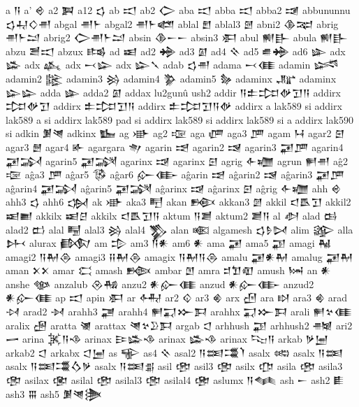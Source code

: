  a  𒀀   
 a'  𒄴   
 a2  𒀉   
 a12  𒌓   
 ab  𒀊   
 ab2  𒀖   
 aba  𒀊   
 abba  𒀊   
 abba2  𒀋   
 abbununnu  𒌓𒄷𒄭𒉣    
 abgal  𒉣𒈨    
 abgal2  𒉣𒈨𒅤    
 ablal  𒆼   
 ablal3  𒇦   
 abni2  𒆠𒉈    
 abrig  𒉣𒈨𒁺    
 abrig2  𒀖𒉣𒈨𒁺    
 absin  𒆠𒀸𒀸    
 absin3  𒀳   
 abul  𒆍𒃲    
 abula  𒆍𒃲    
 abzu  𒍪𒀊    
 abzux  𒌤   
 ad  𒀜   
 ad2  𒄉   
 ad3  𒇼   
 ad4  𒍞   
 ad5  𒌑𒄉    
 ad6  𒇿   
 adx  𒈕   
 adx  𒎉   
 adx  𒁁𒇽    
 adx  𒇽𒃵      
 adab  𒌓𒉣    
 adama  𒁁𒈪    
 adamin  𒈓   
 adamin2  𒈘   
 adamin3  𒄒   
 adamin4  𒉫   
 adamin5  𒂛   
 adaminx  𒂜   
 adaminx  𒇽𒇽    
 adda  𒇿   
 adda2  𒇼   
 addax  lu2gunû ush2  
 addir  𒀀𒉺𒄐𒉻𒋛𒀀    
 addirx  𒄐𒉻𒋛    
 addirx  𒉺𒄐𒋛𒀀    
 addirx  𒉺𒄐𒋛𒀀𒉻    
 addirx  a lak589 si   
 addirx  lak589 a si   
 addirx  lak589 pad si   
 addirx  lak589 si   
 addirx  lak589 si a   
 addirx  lak590 si   
 adkin  𒋠𒇴    
 adkinx  𒋁   
 ag  𒀝   
 ag2  𒉘   
 aga  𒂇   
 aga3  𒂆   
 agam  𒀂   
 agar2  𒇋   
 agar3  𒆻   
 agar4  𒅊   
 agargara  𒉩   
 agarin  𒀌   
 agarin2  𒀎   
 agarin3  𒂼𒂆    
 agarin4  𒂼𒋆    
 agarin5  𒂼𒋋    
 agarinx  𒀏   
 agarinx  𒇉   
 agrig  𒅆𒁾    
 agrun  𒂍𒉣    
 aĝ2  𒉘   
 aĝa3  𒂆   
 aĝar5  𒅐   
 aĝar6  𒅎𒂂    
 aĝarin  𒀌   
 aĝarin2  𒀎   
 aĝarin3  𒂼𒂆    
 aĝarin4  𒂼𒋆    
 aĝarin5  𒂼𒋋    
 aĝarinx  𒀏   
 aĝarinx  𒇉   
 aĝrig  𒅆𒁾    
 ahh  𒄴   
 ahh3  𒌓   
 ahh6  𒌔   
 ak  𒀝   
 aka3  𒋃   
 akan  𒁛   
 akkan3  𒇖   
 akkil  𒃰𒋺𒋛    
 akkil2  𒀜𒆤    
 akkilx  𒀜𒆪    
 akkilx  𒃰𒋺𒋛𒀀    
 aktum  𒀀𒋢    
 aktum2  𒋢𒀀    
 al  𒀠   
 alad  𒆘   
 alad2  𒆗   
 alal  𒋄   
 alal3  𒄒   
 alal4  𒃺   
 alan  𒀩   
 algamesh  𒌓𒊩𒄸    
 alim  𒄋   
 alla  𒉄   
 alurax  𒁃   
 am  𒄠   
 am3  𒀀𒀭    
 am6  𒀭   
 ama  𒂼   
 ama5  𒃣   
 amagi  𒈻   
 amagi2  𒀀𒈹𒁲    
 amagi3  𒍝𒈹𒁲    
 amagix  𒀀𒈹𒀀𒁲    
 amalu  𒂼𒀭𒈹    
 amalug  𒂼𒈹    
 aman  𒉽𒉽    
 amar  𒀫   
 amash  𒁦   
 ambar  𒆹   
 amra  𒄑𒈣𒊏    
 amush  𒀇   
 an  𒀭   
 anshe  𒀲   
 anzalub  𒊮𒄀    
 anzu2  𒀭𒅎𒈪    
 anzud  𒀭𒅎𒂂    
 anzud2  𒀭𒅎𒈪    
 ap  𒀊   
 apin  𒀳   
 ar  𒅈   
 ar2  𒄱   
 ar3  𒄯   
 arx  𒌸   
 ara  𒊭   
 ara3  𒄯   
 arad  𒀴   
 arad2  𒀵   
 arahh3  𒃥   
 arahh4  𒂍𒍑𒁍𒁕    
 arahhx  𒍑𒁍𒁕    
 arali  𒂍𒆳𒈪    
 aralix  𒌽   
 aratta  𒇶   
 arattax  𒇴𒆳𒊒𒁕    
 argab  𒀶   
 arhhush  𒃣   
 arhhush2  𒉦   
 ari2  𒅂   
 arina  𒈸𒀀𒈾    
 arinax  𒄿𒈕𒈾    
 arinax  𒈕𒈾    
 arinax  𒌫𒀀    
 arkab  𒃻𒅁    
 arkab2  𒀶   
 arkabx  𒀶𒅁    
 as  𒊍   
 as4  𒍞   
 asal2  𒀀𒌅𒃮𒇺    
 asalx  𒀷   
 asalx  𒀀𒌅    
 asalx  𒀀𒌅𒃮𒋝𒃻    
 asalx  𒀀𒌅𒉪    
 asil  𒂰   
 asil3  𒂢   
 asilx  𒂡   
 asila  𒂰   
 asila3  𒂢   
 asilax  𒂬   
 asilal  𒂰   
 asilal3  𒂢   
 asilal4  𒂤   
 aslumx  𒀀𒈝    
 ash  𒀸   
 ash2  𒀾   
 ash3  𒐋   
 ash5  𒋠𒇴𒋦    
